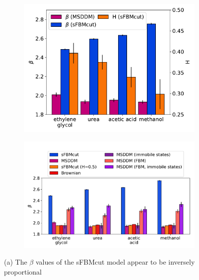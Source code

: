 \documentclass{article}
\begin{document}
  \begin{figure}
  \centering
  \begin{subfigure}{0.43\textwidth}
  \includegraphics[width=\textwidth]{beta_hurst.pdf}
  \caption{}\label{fig:beta_hurst}
  \end{subfigure}
  \begin{subfigure}{0.52\textwidth}
  \includegraphics[width=\textwidth]{beta_parameters.pdf}
  \caption{}\label{fig:beta_parameters}
  \end{subfigure}
  \caption{(a) The $\beta$ values of the sFBMcut model appear to be inversely proportional
}
\end{figure}
\end{document}
